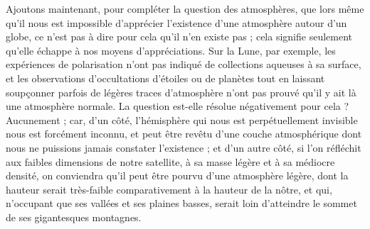 \documentclass[a4paper, 11pt, oneside]{article}
\begin{document}
Ajoutons maintenant, pour compléter la question des atmosphères, que lors même qu'il nous est impossible d'apprécier l'existence d'une atmosphère autour d'un globe, ce n'est pas à dire pour cela qu'il n'en existe pas ; cela signifie seulement qu'elle échappe à nos moyens d'appréciations. Sur la Lune, par exemple, les expériences de polarisation n'ont pas indiqué de collections aqueuses à sa surface, et les observations d'occultations d'étoiles ou de planètes tout en laissant soupçonner parfois de légères traces d'atmosphère n'ont pas prouvé qu'il y ait là une atmosphère normale. La question est-elle résolue négativement pour cela ? Aucunement ; car, d'un côté, l'hémisphère qui nous est perpétuellement invisible nous est forcément inconnu, et peut être revêtu d'une couche atmosphérique dont nous ne puissions jamais constater l'existence ; et d'un autre côté, si l'on réfléchit aux faibles dimensions de notre satellite, à sa masse légère et à sa médiocre densité, on conviendra qu'il peut être pourvu d'une atmosphère légère, dont la hauteur serait très-faible comparativement à la hauteur de la nôtre, et qui, n'occupant que ses vallées et ses plaines basses, serait loin d'atteindre le sommet de ses gigantesques montagnes.
\end{document}
